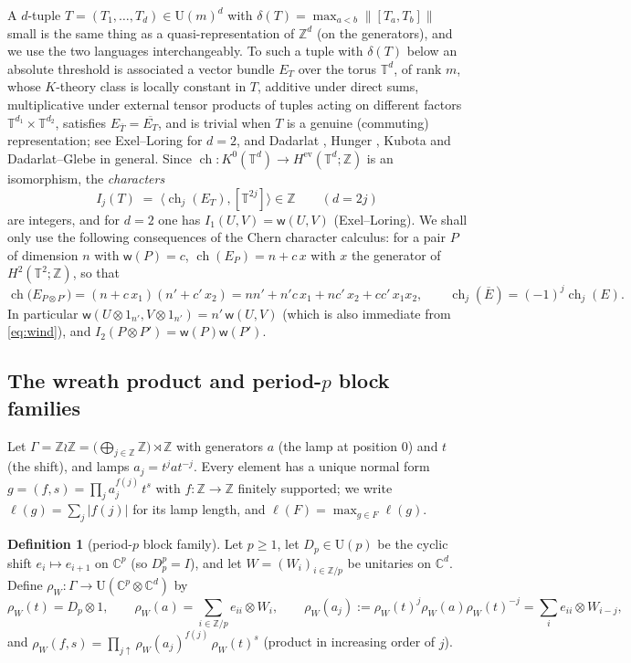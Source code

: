 \documentclass[11pt]{amsart}
\theoremstyle{definition}
\newtheorem{definition}[theorem]{Definition}
\theoremstyle{remark}
\newcommand{\Z}{\mathbb Z}
\newcommand{\C}{\mathbb C}
\newcommand{\T}{\mathbb T}
\newcommand{\ch}{\operatorname{ch}}
\newcommand{\wind}{\mathsf w}
\newcommand{\U}{\mathrm U}
\newcommand{\norm}[1]{\lVert #1\rVert}
\newcommand{\lamp}{a}
\begin{document}
A $d$-tuple $T=(T_1,\dots,T_d)\in\U(m)^d$ with $\delta(T)=\max_{a<b}\norm{[T_a,T_b]}$ small is the same thing as a quasi-representation of $\Z^d$ (on the generators), and we use the two languages interchangeably. To such a tuple with $\delta(T)$ below an absolute threshold is associated a vector bundle $E_T$ over the torus $\T^d$, of rank $m$, whose $K$-theory class is locally constant in $T$, additive under direct sums, multiplicative under external tensor products of tuples acting on different factors $\T^{d_1}\times\T^{d_2}$, satisfies $E_{\overline T}=\overline{E_T}$, and is trivial when $T$ is a genuine (commuting) representation; see Exel--Loring \cite{EL91} for $d=2$, and Dadarlat \cite{Dad12}, Hunger \cite{Hun19}, Kubota \cite{Kub19} and Dadarlat--Glebe \cite{DG25} in general. Since $\ch\colon K^0(\T^{d})\to H^{\mathrm{ev}}(\T^{d};\Z)$ is an isomorphism, the \emph{characters}
\begin{equation}\label{eq:Ij}
I_j(T)\;=\;\bigl\langle \ch_j(E_T),[\T^{2j}]\bigr\rangle\in\Z\qquad(d=2j)
\end{equation}
are integers, and for $d=2$ one has $I_1(U,V)=\wind(U,V)$ (Exel--Loring). We shall only use the following consequences of the Chern character calculus: for a pair $P$ of dimension $n$ with $\wind(P)=c$, $\ch(E_P)=n+c\,x$ with $x$ the generator of $H^2(\T^2;\Z)$, so that
\begin{equation}\label{eq:tensorch}
\ch\bigl(E_{P\otimes P'}\bigr)=(n+c\,x_1)(n'+c'\,x_2)=nn'+n'c\,x_1+nc'\,x_2+cc'\,x_1x_2,
\qquad \ch_j(\overline E)=(-1)^j\ch_j(E).
\end{equation}
In particular $\wind(U\otimes 1_{n'},V\otimes1_{n'})=n'\,\wind(U,V)$ (which is also immediate from \eqref{eq:wind}), and $I_2(P\otimes P')=\wind(P)\wind(P')$.

\subsection{The wreath product and period-$p$ block families}\label{sec:model}

Let $\Gamma=\Z\wr\Z=\bigl(\bigoplus_{j\in\Z}\Z\bigr)\rtimes\Z$ with generators $\lamp$ (the lamp at position $0$) and $t$ (the shift), and lamps $\lamp_j=t^j\lamp t^{-j}$. Every element has a unique normal form $g=(f,s)=\prod_{j}\lamp_j^{f(j)}\,t^{s}$ with $f\colon\Z\to\Z$ finitely supported; we write $\ell(g)=\sum_j|f(j)|$ for its lamp length, and $\ell(F)=\max_{g\in F}\ell(g)$.

\begin{definition}[period-$p$ block family]\label{def:block}
Let $p\ge1$, let $D_p\in\U(p)$ be the cyclic shift $e_i\mapsto e_{i+1}$ on $\C^p$ (so $D_p^p=I$), and let $W=(W_i)_{i\in\Z/p}$ be unitaries on $\C^{d}$. Define $\rho_W\colon\Gamma\to\U(\C^p\otimes\C^{d})$ by
\[
\rho_W(t)=D_p\otimes1,\qquad \rho_W(\lamp)=\sum_{i\in\Z/p}e_{ii}\otimes W_i,\qquad
\rho_W(\lamp_j):=\rho_W(t)^j\rho_W(\lamp)\rho_W(t)^{-j}=\sum_i e_{ii}\otimes W_{i-j},
\]
and $\rho_W(f,s)=\prod_{j\uparrow}\rho_W(\lamp_j)^{f(j)}\,\rho_W(t)^s$ (product in increasing order of $j$).
\end{definition}
\end{document}
